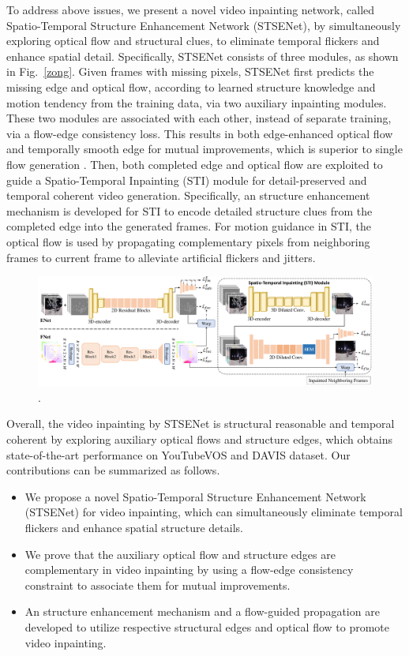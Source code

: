 \documentclass[letterpaper]{article} %
\begin{document}
To address above issues, we present a novel video inpainting network, called Spatio-Temporal Structure Enhancement Network (STSENet), by simultaneously exploring optical flow and structural clues, to eliminate temporal flickers and enhance spatial detail. 
Specifically, STSENet consists of three modules, as shown in Fig.~\ref{zong}.
Given frames with missing pixels, STSENet first predicts the missing edge and optical flow, according to learned structure knowledge and motion tendency from the training data, via two auxiliary inpainting modules.
These two modules are associated with each other, instead of separate training, via a flow-edge consistency loss.
This results in both edge-enhanced optical flow and temporally smooth edge for mutual improvements, which is superior to single flow generation \cite{Xu_2019_CVPR,Kim_2019_CVPR1}.
Then, both completed edge and optical flow are exploited to guide a Spatio-Temporal Inpainting (STI) module for detail-preserved and temporal coherent video generation.
Specifically, an structure enhancement mechanism is developed for STI to encode detailed structure clues from the completed edge into the generated frames.
For motion guidance in STI, the optical flow is used by propagating complementary pixels from neighboring frames to current frame to alleviate artificial flickers and jitters.


\begin{figure}[t]
	\centering
	\includegraphics[width=2.0\columnwidth]{sti} %
	\caption{. }
	\label{sti}
\end{figure}


Overall, the video inpainting by STSENet is structural reasonable and temporal coherent by exploring auxiliary optical flows and structure edges, which obtains state-of-the-art performance on YouTubeVOS and DAVIS dataset. Our contributions can be summarized as follows.
\begin{itemize}
	\item We propose a novel Spatio-Temporal Structure Enhancement Network (STSENet) for video inpainting, which can simultaneously eliminate temporal flickers and enhance spatial structure details.
	\item We prove that the auxiliary optical flow and structure edges are complementary in video inpainting by using a flow-edge consistency constraint to associate them for mutual improvements.
	\item An structure enhancement mechanism and a flow-guided propagation are developed to utilize respective structural edges and optical flow to promote video inpainting.			
\end{itemize}
\end{document}
